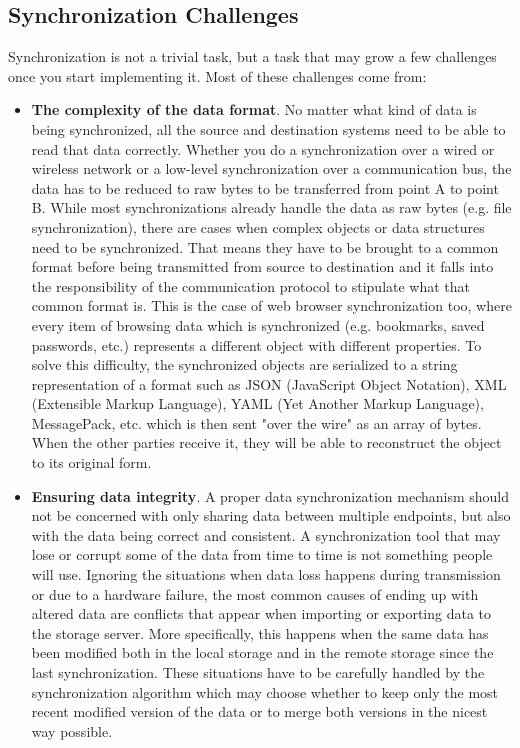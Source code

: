 
\clearpage

\subsection{Synchronization Challenges}
\label{sub-sec:sync-challenges}

Synchronization is not a trivial task, but a task that may grow a few challenges once you start implementing it. Most of these challenges come from:

\begin{itemize}
  \item \textbf{The complexity of the data format}. No matter what kind of data is being synchronized, all the source and destination systems need to be able to read that data correctly. Whether you do a synchronization over a wired or wireless network or a low-level synchronization over a communication bus, the data has to be reduced to raw bytes to be transferred from point A to point B. While most synchronizations already handle the data as raw bytes (e.g. file synchronization), there are cases when complex objects or data structures need to be synchronized. That means they have to be brought to a common format before being transmitted from source to destination and it falls into the responsibility of the communication protocol to stipulate what that common format is. This is the case of web browser synchronization too, where every item of browsing data which is synchronized (e.g. bookmarks, saved passwords, etc.) represents a different object with different properties. To solve this difficulty, the synchronized objects are serialized to a string representation of a format such as JSON (JavaScript Object Notation), XML (Extensible Markup Language), YAML (Yet Another Markup Language), MessagePack, etc. which is then sent "over the wire" as an array of bytes. When the other parties receive it, they will be able to reconstruct the object to its original form.

  \item \textbf{Ensuring data integrity}. A proper data synchronization mechanism should not be concerned with only sharing data between multiple endpoints, but also with the data being correct and consistent. A synchronization tool that may lose or corrupt some of the data from time to time is not something people will use. Ignoring the situations when data loss happens during transmission or due to a hardware failure, the most common causes of ending up with altered data are conflicts that appear when importing or exporting data to the storage server. More specifically, this happens when the same data has been modified both in the local storage and in the remote storage since the last synchronization. These situations have to be carefully handled by the synchronization algorithm which may choose whether to keep only the most recent modified version of the data or to merge both versions in the nicest way possible.


\end{itemize}
